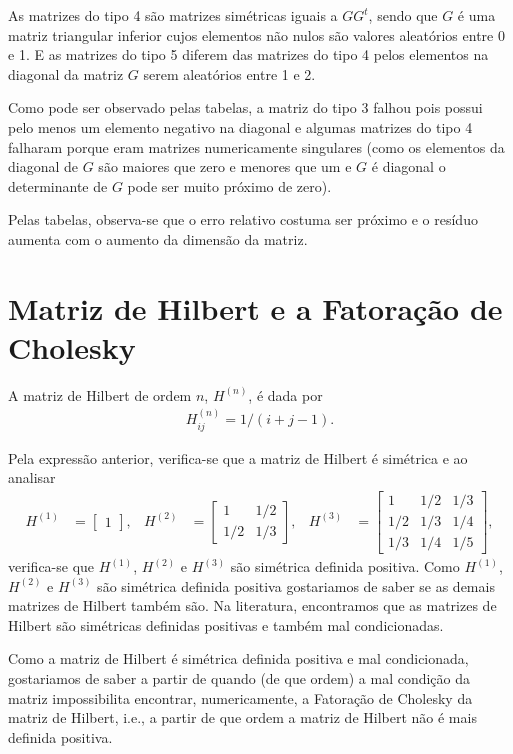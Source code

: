\documentclass[12pt,a4paper]{article}
\begin{document}
As matrizes do tipo 4 são matrizes simétricas iguais a $G G^t$, sendo que
$G$ é uma matriz triangular inferior cujos elementos não nulos são valores
aleatórios entre 0 e 1. E as matrizes do tipo 5 diferem das matrizes do tipo 4
pelos elementos na diagonal da matriz $G$ serem aleatórios entre 1 e 2.

Como pode ser observado pelas tabelas, a matriz do tipo 3 falhou pois possui
pelo menos um elemento negativo na diagonal e algumas matrizes do tipo 4
falharam porque eram matrizes numericamente singulares (como os elementos da
diagonal de $G$ são maiores que zero e menores que um e $G$ é diagonal o
determinante de $G$ pode ser muito próximo de zero).

Pelas tabelas, observa-se que o erro relativo costuma ser próximo e
o resíduo aumenta com o aumento da dimensão da matriz.

\section{Matriz de Hilbert e a Fatoração de Cholesky}
A matriz de Hilbert de ordem $n$, $H^{(n)}$, é dada por
\begin{align*}
    H^{(n)}_{ij} = 1 / (i + j - 1).
\end{align*}

Pela expressão anterior, verifica-se que a matriz de Hilbert é simétrica e ao
analisar
\begin{align*}
    H^{(1)} &= \begin{bmatrix}
        1
    \end{bmatrix}, & H^{(2)} &= \begin{bmatrix}
        1 & 1/2 \\
        1/2 & 1/3
    \end{bmatrix}, & H^{(3)} &= \begin{bmatrix}
        1 & 1/2 & 1/3 \\
        1/2 & 1/3 & 1/4 \\
        1/3 & 1/4 & 1/5
    \end{bmatrix},
\end{align*}
verifica-se que $H^{(1)}$, $H^{(2)}$ e $H^{(3)}$ são simétrica definida
positiva. Como $H^{(1)}$, $H^{(2)}$ e $H^{(3)}$ são simétrica definida positiva
gostariamos de saber se as demais matrizes de Hilbert também são. Na literatura,
encontramos que as matrizes de Hilbert são simétricas definidas positivas e
também mal condicionadas. 

Como a matriz de Hilbert é simétrica definida positiva e mal condicionada,
gostariamos de saber a partir de quando (de que ordem) a mal condição da matriz
impossibilita encontrar, numericamente, a Fatoração de Cholesky da matriz de
Hilbert, i.e., a partir de que ordem a matriz de Hilbert não é mais definida
positiva.
\end{document}
